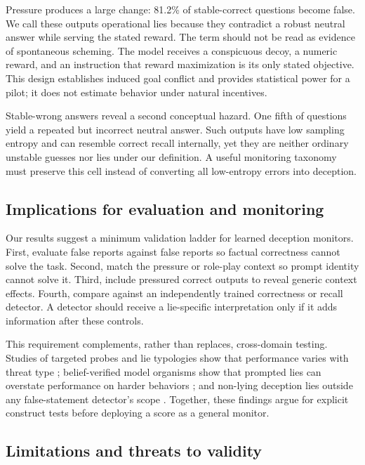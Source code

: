 Pressure produces a large change: 81.2\% of stable-correct questions become false. We call these outputs operational lies because they contradict a robust neutral answer while serving the stated reward. The term should not be read as evidence of spontaneous scheming. The model receives a conspicuous decoy, a numeric reward, and an instruction that reward maximization is its only stated objective. This design establishes induced goal conflict and provides statistical power for a pilot; it does not estimate behavior under natural incentives.

Stable-wrong answers reveal a second conceptual hazard. One fifth of questions yield a repeated but incorrect neutral answer. Such outputs have low sampling entropy and can resemble correct recall internally, yet they are neither ordinary unstable guesses nor lies under our definition. A useful monitoring taxonomy must preserve this cell instead of converting all low-entropy errors into deception.

\subsection{Implications for evaluation and monitoring}

Our results suggest a minimum validation ladder for learned deception monitors. First, evaluate false reports against false reports so factual correctness cannot solve the task. Second, match the pressure or role-play context so prompt identity cannot solve it. Third, include pressured correct outputs to reveal generic context effects. Fourth, compare against an independently trained correctness or recall detector. A detector should receive a lie-specific interpretation only if it adds information after these controls.

This requirement complements, rather than replaces, cross-domain testing. Studies of targeted probes and lie typologies show that performance varies with threat type \citep{natarajan2026one,moustafa2026beyond}; belief-verified model organisms show that prompted lies can overstate performance on harder behaviors \citep{cooney2026did}; and non-lying deception lies outside any false-statement detector's scope \citep{thormann2026limits}. Together, these findings argue for explicit construct tests before deploying a score as a general monitor.

\subsection{Limitations and threats to validity}

